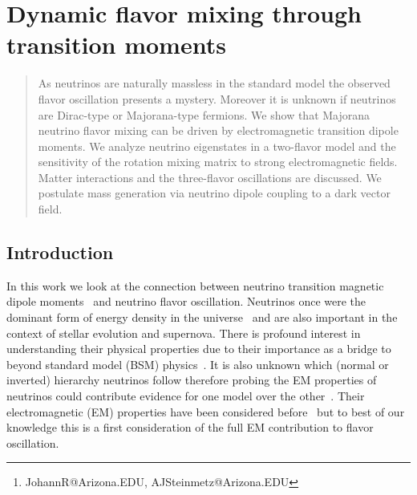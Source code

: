 \documentclass[addchapnum]{ws-rv961x669} %
\begin{document}
\chapter[Dynamic flavor mixing through transition moments]{Dynamic flavor mixing through transition moments\label{JR_ch1}}

\author[J. Rafelski and A. Steinmetz]{Johann Rafelski and Andrew Steinmetz\footnote{JohannR@Arizona.EDU, AJSteinmetz@Arizona.EDU}}

\address{Department of Physics, The University of Arizona, Tucson, AZ 85721, USA}

\begin{abstract} 
As neutrinos are naturally massless in the standard model the observed flavor oscillation presents a mystery. Moreover it is unknown if neutrinos are Dirac-type or Majorana-type fermions. We show that Majorana neutrino flavor mixing can be driven by electromagnetic transition dipole moments. We analyze neutrino eigenstates in a two-flavor model and the sensitivity of the rotation mixing matrix to strong electromagnetic fields. Matter interactions and the three-flavor oscillations are discussed. We postulate mass generation via neutrino dipole coupling to a dark vector field.
\end{abstract}


\body


\section{Introduction}
\label{sec:intro}

In this work we look at the connection between neutrino transition magnetic dipole moments~\cite{Fujikawa:1980yx,Shrock:1980vy,Shrock:1982sc} and neutrino flavor oscillation. Neutrinos once were the dominant form of energy density in the universe~\cite{Rafelski:2023emw} and are also important in the context of stellar evolution and supernova. There is profound interest in understanding their physical properties due to their importance as a bridge to beyond standard model (BSM) physics~\cite{DUNE:2020fgq}. It is also unknown which (normal or inverted) hierarchy neutrinos follow therefore probing the EM properties of neutrinos could contribute evidence for one model over the other~\cite{Kouzakov:2023jtt}. Their electromagnetic (EM) properties have been considered before~\cite{Schechter:1981hw,Giunti:2014ixa,Chukhnova:2019oum,Popov:2019nkr} but to best of our knowledge this is a first consideration of the full EM contribution to flavor oscillation.
\end{document}
